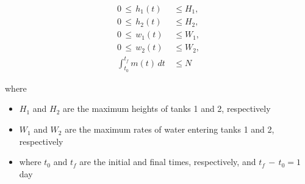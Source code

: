 \documentclass[12pt]{article}
\newenvironment{problem}[2][Problem]{\begin{trivlist}
\item[\hskip \labelsep {\bfseries #1}\hskip \labelsep {\bfseries #2.}]}{\end{trivlist}}
\begin{document}
\begin{align}
    0 \, \leq \, h_1 (t) \, & \leq H_1, \\
    0 \, \leq \, h_2 (t) \, & \leq H_2, \\
    0 \, \leq \, w_1 (t) \, & \leq W_1, \\
    0 \, \leq \, w_2 (t) \, & \leq W_2, \\
    \int_{t_0}^{t_f} m (t) \, dt \, & \leq N 
\end{align}

\noindent where 

\begin{itemize}
    \item $H_1$ and $H_2$ are the maximum heights of tanks 1 and 2, respectively
    \item $W_1$ and $W_2$ are the maximum rates of water entering tanks 1 and 2, respectively
    \item where $t_0$ and $t_f$ are the initial and final times, respectively, and $t_f \, - \, t_0 = 1$ day
\end{itemize}

\newpage
\begin{problem}{2-3}

\end{problem}

 
\end{document}
